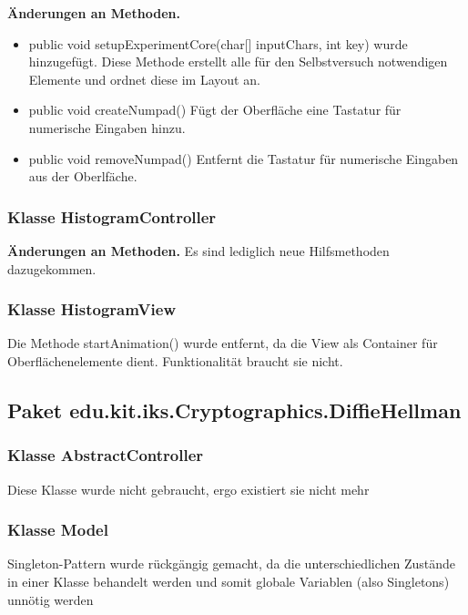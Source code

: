 \documentclass{article}
\begin{document}
	 \textbf{Änderungen an Methoden.}\newline
	   \begin{itemize}
	     \item public void setupExperimentCore(char[] inputChars, int key) wurde hinzugefügt.\newline
	           Diese Methode erstellt alle für den Selbstversuch notwendigen Elemente und ordnet diese im Layout an.
             \item public void createNumpad()\newline
               Fügt der Oberfläche eine Tastatur für numerische Eingaben hinzu.
             \item public void removeNumpad()\newline
               Entfernt die Tastatur für numerische Eingaben aus der Oberlfäche.
           \end{itemize}
               
	\subsubsection{Klasse HistogramController}
          \textbf{Änderungen an Methoden.}\newline
           Es sind lediglich neue Hilfsmethoden dazugekommen.
	\subsubsection{Klasse HistogramView}
	 Die Methode startAnimation() wurde entfernt, da die View als Container für Oberflächenelemente dient. 
	 Funktionalität braucht sie nicht.

  \subsection{Paket edu.kit.iks.Cryptographics.DiffieHellman}
  
    \subsubsection{Klasse AbstractController}
    Diese Klasse wurde nicht gebraucht, ergo existiert sie nicht mehr

  	\subsubsection{Klasse Model}
    Singleton-Pattern wurde rückgängig gemacht, da die unterschiedlichen Zustände
    in einer Klasse behandelt werden und somit globale Variablen (also Singletons)
    unnötig werden
\end{document}
